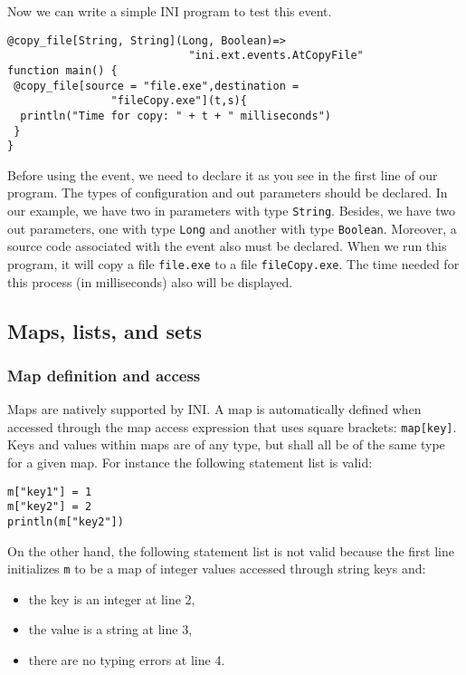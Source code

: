 \documentclass[11pt]{article}
\begin{document}
Now we can write a simple INI program to test this event.
\begin{lstlisting}
@copy_file[String, String](Long, Boolean)=>
                            "ini.ext.events.AtCopyFile"
function main() {
 @copy_file[source = "file.exe",destination = 
                "fileCopy.exe"](t,s){
  println("Time for copy: " + t + " milliseconds")
 }
}
\end{lstlisting}
Before using the event, we need to declare it as you see in the first line of our program. The types of configuration and out parameters should be declared. In our example, we have two in parameters with type \texttt{String}. Besides, we have two out parameters, one with type \texttt{Long} and another with type \texttt{Boolean}. Moreover, a source code associated with the event also must be declared. When we run this program, it will copy a file \texttt{file.exe} to a file \texttt{fileCopy.exe}. The time needed for this process (in milliseconds) also will be displayed.

\subsection{Maps, lists, and sets}

\subsubsection{Map definition and access}

Maps are natively supported by INI. A map is automatically defined when accessed through the map access expression that uses square brackets: \texttt{map[key]}. Keys and values within maps are of any type, but shall all be of the same type for a given map. For instance the following statement list is valid:

\begin{lstlisting}[numbers=none]
m["key1"] = 1
m["key2"] = 2
println(m["key2"])
\end{lstlisting}

On the other hand, the following statement list is not valid because the first line initializes \texttt{m} to be a map of integer values accessed through string keys and:

\begin{itemize}
\item the key is an integer at line 2,
\item the value is a string at line 3,
\item there are no typing errors at line 4.
\end{itemize}
\end{document}
